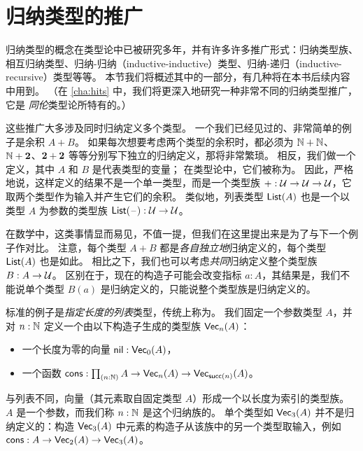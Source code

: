 \section{归纳类型的推广}
\label{sec:generalizations}

%
归纳类型的概念在类型论中已被研究多年，并有许多许多推广形式：归纳类型族、相互归纳类型、归纳-归纳（inductive-inductive）类型、归纳-递归（inductive-recursive）类型等等。
本节我们将概述其中的一部分，有几种将在本书后续内容中用到。
（在 \cref{cha:hits} 中，我们将更深入地研究一种非常不同的归纳类型推广，它是 \emph{同伦}类型论所特有的。）

这些推广大多涉及同时归纳定义多个类型。
一个我们已经见过的、非常简单的例子是余积 $A+B$。
如果每次想要考虑两个类型的余积时，都必须为 $\mathbb{N}+\mathbb{N}$、$\mathbb{N}+\mathbf{2}$、$\mathbf{2}+\mathbf{2}$ 等等分别写下独立的归纳定义，那将非常繁琐。
相反，我们做一个定义，其中 $A$ 和 $B$ 是代表类型的变量；
%
在类型论中，它们被称为。%
因此，严格地说，这样定义的结果不是一个单一类型，而是一个类型族 $+ : \mathcal{U}\to\mathcal{U}\to\mathcal{U}$，它取两个类型作为输入并产生它们的余积。
类似地，列表类型 $\mathsf{List}(A)$ 也是一个以类型 $A$ 为参数的类型族 $\mathsf{List}(\mathord{\hspace{1pt}\text{--}\hspace{1pt}}):\mathcal{U}\to\mathcal{U}$。

在数学中，这类事情显而易见，不值一提，但我们在这里提出来是为了与下一个例子作对比。
注意，每个类型 $A+B$ 都是\emph{各自独立地}归纳定义的，每个类型 $\mathsf{List}(A)$ 也是如此。
%
%
相比之下，我们也可以考虑\emph{共同}归纳定义整个类型族 $B:A\to\mathcal{U}$。
区别在于，现在的构造子可能会改变指标 $a:A$，其结果是，我们不能说单个类型 $B(a)$ 是归纳定义的，只能说整个类型族是归纳定义的。

%
%
标准的例子是\emph{指定长度的列表}类型，传统上称为。
我们固定一个参数类型 $A$，并对 $n:\mathbb{N}$ 定义一个由以下构造子生成的类型族 $\mathsf{Vec}_{n}(A)$：

\begin{itemize}
\item 一个长度为零的向量 $\mathsf{nil}:\mathsf{Vec}_{0}(A)$，
\item 一个函数 $\cons:\prd{n:\nat} A\to \vect n A \to \vect{\suc (n)} A$。
\end{itemize}

与列表不同，向量（其元素取自固定类型 $A$）形成一个以长度为索引的类型族。
$A$ 是一个参数，而我们称 $n:\mathbb{N}$ 是这个归纳族的。
%
单个类型如 $\mathsf{Vec}_{3}(A)$ 并不是归纳定义的：构造 $\mathsf{Vec}_{3}(A)$ 中元素的构造子从该族中的另一个类型取输入，例如 $\mathsf{cons}:A \to \mathsf{Vec}_{2}(A) \to \mathsf{Vec}_{3}(A)$。

